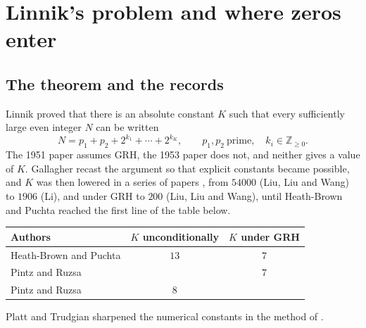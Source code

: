\section{Linnik's problem and where zeros enter}\label{gl:sec:linnik}

\subsection{The theorem and the records}

Linnik \cite{Linnik51,Linnik53} proved that there is an absolute constant $K$ such that every sufficiently large even integer $N$ can be written
\begin{equation}\label{gl:eq:linnik}
N = p_1 + p_2 + 2^{k_1} + \cdots + 2^{k_K},\qquad p_1,p_2\ \text{prime},\quad k_i\in\mathbb Z_{\ge0}.
\end{equation}
The 1951 paper assumes GRH, the 1953 paper does not, and neither gives a value of $K$. Gallagher \cite{Gallagher75} recast the argument so that explicit constants became possible, and $K$ was then lowered in a series of papers \cite{LLW98,LLW99,Li00,Wang99,Li01}, from $54000$ (Liu, Liu and Wang) to $1906$ (Li), and under GRH to $200$ (Liu, Liu and Wang), until Heath-Brown and Puchta \cite{HBP02} reached the first line of the table below.

\begin{center}
\begin{tabular}{lcc}
\toprule
Authors & $K$ unconditionally & $K$ under GRH\\
\midrule
Heath-Brown and Puchta \cite{HBP02} & $13$ & $7$\\
Pintz and Ruzsa \cite{PR03} & & $7$\\
Pintz and Ruzsa \cite{PR20} & $8$ &\\
\bottomrule
\end{tabular}
\end{center}
Platt and Trudgian \cite{PlattTrudgian15} sharpened the numerical constants in the method of \cite{HBP02}.

